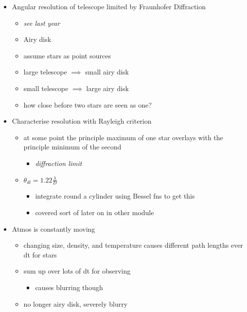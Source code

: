 \documentclass[a4paper,11pt,normalem]{article}
\begin{document}
\begin{itemize}
    \item Angular resolution of telescope limited by Fraunhofer Diffraction
        \begin{itemize}
            \item \emph{see last year}
            \item Airy disk
            \item assume stars as point sources
            \item large telescope \(\implies\) small airy disk
            \item small telescope \(\implies\) large airy disk
            \item how close before two stars are seen as one?
        \end{itemize}
    \item Characterise resolution with Rayleigh criterion
        \begin{itemize}
            \item at some point the principle maximum of one star overlays with the principle minimum of the second
                \begin{itemize}
                    \item \emph{diffraction limit}
                \end{itemize}
            \item \(\theta_{dl} = 1.22\frac{\lambda}{D}\)
                \begin{itemize}
                    \item integrate round a cylinder using Bessel fns to get this
                    \item covered sort of later on in other module
                \end{itemize}
        \end{itemize}
    \item Atmos is constantly moving
        \begin{itemize}
            \item changing size, density, and temperature causes different path lengths ever dt for stars
            \item sum up over lots of dt for observing
                \begin{itemize}
                    \item causes blurring though
                \end{itemize}
            \item no longer airy disk, severely blurry
        \end{itemize}

\end{itemize}
\end{document}
